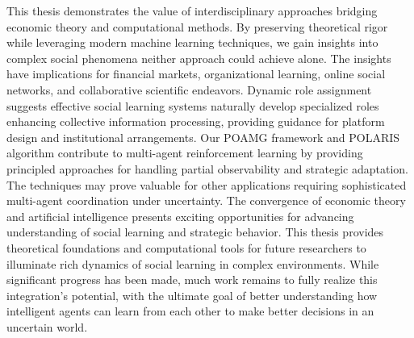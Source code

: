 This thesis demonstrates the value of interdisciplinary approaches bridging economic theory and computational methods. By preserving theoretical rigor while leveraging modern machine learning techniques, we gain insights into complex social phenomena neither approach could achieve alone. The insights have implications for financial markets, organizational learning, online social networks, and collaborative scientific endeavors. Dynamic role assignment suggests effective social learning systems naturally develop specialized roles enhancing collective information processing, providing guidance for platform design and institutional arrangements. Our POAMG framework and POLARIS algorithm contribute to multi-agent reinforcement learning by providing principled approaches for handling partial observability and strategic adaptation. The techniques may prove valuable for other applications requiring sophisticated multi-agent coordination under uncertainty. The convergence of economic theory and artificial intelligence presents exciting opportunities for advancing understanding of social learning and strategic behavior. This thesis provides theoretical foundations and computational tools for future researchers to illuminate rich dynamics of social learning in complex environments. While significant progress has been made, much work remains to fully realize this integration's potential, with the ultimate goal of better understanding how intelligent agents can learn from each other to make better decisions in an uncertain world.
